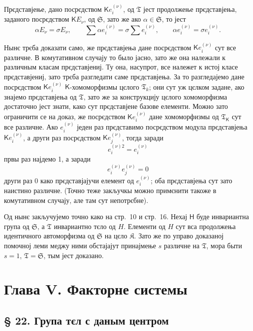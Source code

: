 \documentclass[11pt]{article}
\begin{document}
Прєдставјење, дано посрєдством \(\mathsf K e_i^{(\nu)}\), од \(\mathfrak T\) јест продолжење прєдставјења, заданого посрєдством \(\mathsf K E_\nu\), од \(\mathfrak S\), зато же ако \(\alpha\in \mathfrak S\), то јест
\[
\alpha E_\nu=\sigma E_\nu,\qquad
\sum \alpha e_i^{(\nu)}=\sigma\sum e_i^{(\nu)},\qquad
\alpha e_i^{(\nu)}=\sigma e_i^{(\nu)}.
\]

Нынє трєба доказати само, же прєдставјења дане посрєдством \(\mathsf K e_i^{(\nu)}\) сут все различне. В комутативном случају то было јасно, зато же она належали к различным класам прєдставјениј. Ту она, насупрот, все належет к истој класе прєдставјениј, зато трєба разгледати саме прєдставјења. За то разгледајемо дане посрєдством \(\mathsf K e_i^{(\nu)}\) \(\mathsf{K}\)-хомоморфизмы цєлого \(\mathfrak T_k\); они сут уж цєлком задане, ако знајемо прєдставјења од \(\mathfrak T\), зато же за конструкцију цєлого хомоморфизма достаточно јест знати, како сут прєдставјене базове елементи. Можно зато ограничити се на доказ, же посрєдством \(\mathsf K e_i^{(\nu)}\) дане хомоморфизмы од \(\mathfrak T_{\mathsf{K}}\) сут все различне. Ако \(e_i^{(\nu)}\) једен раз прєдставимо посрєдством модула прєдставјења \(\mathsf K e_i^{(\nu)}\), а други раз посрєдством \(\mathsf K e_j^{(\nu)}\), тогда заради
\[
e_i^{(\nu)2}=e_i^{(\nu)}
\]
првы раз најдемо 1, а заради
\[
e_i^{(\nu)}e_j^{(\nu)}=0
\]
други раз 0 како прєдставјајучи елемент од \(e_i^{(\nu)}\); оба прєдставјења сут зато наистино различне. (Точно теже закључкы можно примєнити такоже в комутативном случају, але там сут непотрєбне).

Од нынє закључујемо точно како на стр.~10 и стр.~16. Нехај \(\mathsf{H}\) буде инвариантна група од \(\mathfrak S\), а \(\mathfrak T\) инвариантно тєло од \(H\). Елементи од \(H\) сут вса продолжења идентичного автоморфизма од \(\mathfrak S\) на цєло \(\mathfrak K\). Зато же по управо доказаној помочној леми меджу ними обстајајут принајмење \(s\) различне на \(\mathfrak T\), мора быти \(s=1\), \(\mathfrak T=\mathfrak S\), тым јест доказано.

\section*{Глава V. Факторне системы}\label{kapitel-v.-faktorensysteme}

\subsection*{§ 22. Група тєл с даным центром}\label{die-gruppe-der-koerper-mit-gegebenem-zentrum}
\end{document}
